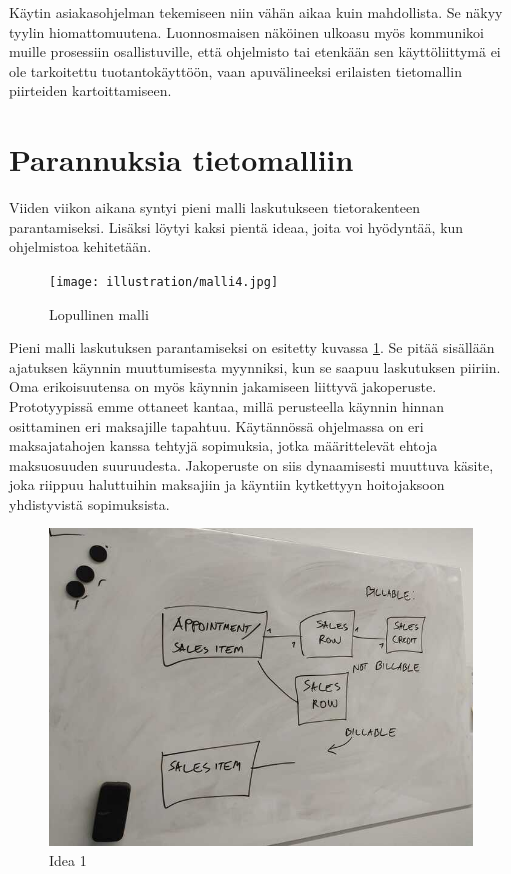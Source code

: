 Käytin asiakasohjelman tekemiseen niin vähän aikaa kuin mahdollista. Se
näkyy tyylin hiomattomuutena. Luonnosmaisen näköinen ulkoasu myös
kommunikoi muille prosessiin osallistuville, että ohjelmisto tai
etenkään sen käyttöliittymä ei ole tarkoitettu tuotantokäyttöön, vaan
apuvälineeksi erilaisten tietomallin piirteiden kartoittamiseen.

\hypertarget{parannuksia-tietomalliin}{%
\section{Parannuksia tietomalliin}\label{parannuksia-tietomalliin}}

Viiden viikon aikana syntyi pieni malli laskutukseen tietorakenteen
parantamiseksi. Lisäksi löytyi kaksi pientä ideaa, joita voi hyödyntää,
kun ohjelmistoa kehitetään.

\begin{figure}
\centering
\texttt{[image: illustration/malli4.jpg]}
\caption{\label{finalmodel1-again}Lopullinen malli}
\end{figure}

Pieni malli laskutuksen parantamiseksi on esitetty kuvassa
\ref{finalmodel1-again}. Se pitää sisällään ajatuksen käynnin
muuttumisesta myynniksi, kun se saapuu laskutuksen piiriin. Oma
erikoisuutensa on myös käynnin jakamiseen liittyvä jakoperuste.
Prototyypissä emme ottaneet kantaa, millä perusteella käynnin hinnan
osittaminen eri maksajille tapahtuu. Käytännössä ohjelmassa on eri
maksajatahojen kanssa tehtyjä sopimuksia, jotka määrittelevät ehtoja
maksuosuuden suuruudesta. Jakoperuste on siis dynaamisesti muuttuva
käsite, joka riippuu haluttuihin maksajiin ja käyntiin kytkettyyn
hoitojaksoon yhdistyvistä sopimuksista.

\begin{figure}
\centering
\includegraphics{illustration/final-idea-1.jpg}
\caption{\label{finalidea1}Idea 1}
\end{figure}

